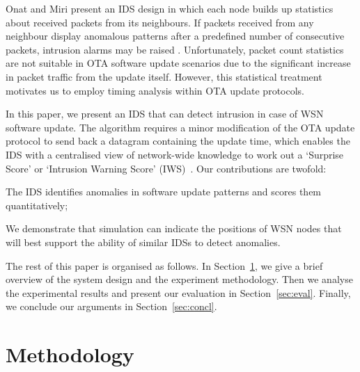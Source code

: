 \documentclass{CRPITStyle}
\renewcommand{\cite}{\citep}
\begin{document}
Onat and Miri present an IDS design in which each node builds up statistics about received packets from its neighbours.
If packets received from any neighbour display anomalous patterns after a predefined number of consecutive packets, intrusion alarms may be raised \cite{1512911}.
Unfortunately, packet count statistics are not suitable in OTA software update scenarios due to the significant increase in packet traffic from the update itself.
However, this statistical treatment motivates us to employ timing analysis within OTA update protocols.

In this paper, we present an IDS that can detect intrusion in case of WSN software update.
The algorithm requires a minor modification of the OTA update protocol to send back a datagram containing the update time, 
which enables the IDS with a centralised view of network-wide knowledge to work out a  `Surprise Score' or `Intrusion Warning Score' (IWS)~\cite{aalam15}.
Our contributions are twofold: 
\begin{inparaenum}
\item  The IDS identifies anomalies in software update patterns and scores them quantitatively;
\item We demonstrate that simulation can indicate the positions of WSN nodes that will best support the ability of similar IDSs to detect anomalies. 
\end{inparaenum}
The rest of this paper is organised as follows.
In Section~\ref{sec:meth}, we give a brief overview of the system  design and the experiment methodology. 
Then we analyse the experimental results and present our evaluation in Section~\ref{sec:eval}.  
Finally, we conclude our arguments in Section~\ref{sec:concl}.

\section{Methodology}
\label{sec:meth}
\end{document}
